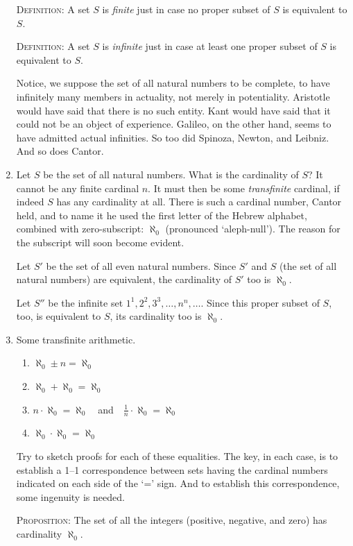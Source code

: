 \documentclass[twoside,openright]{article}
\begin{document}
\begin{enumerate}
  \textsc{Definition}: A set $S$ is \emph{finite} just in case no
  proper subset of $S$ is equivalent to $S$.

  \textsc{Definition}: A set $S$ is \emph{infinite} just in case at
  least one proper subset of $S$ is equivalent to $S$.

  Notice, we suppose the set of all natural numbers to be complete, to
  have infinitely many members in actuality, not merely in
  potentiality. Aristotle would have said that there is no such
  entity. Kant would have said that it could not be an object of
  experience. Galileo, on the other hand, seems to have admitted
  actual infinities. So too did Spinoza, Newton, and Leibniz. And so
  does Cantor.
\item \label{alephnull} Let $S$ be the set of all natural
  numbers. What is the cardinality of $S$? It cannot be any finite
  cardinal $n$. It must then be some \emph{transfinite} cardinal, if
  indeed $S$ has any cardinality at all. There is such a cardinal
  number, Cantor held, and to name it he used the first letter of the
  Hebrew alphabet, combined with zero-subscript: $\aleph_{0}$
  (pronounced `aleph-null'). The reason for the subscript will soon
  become evident. \label{subscript}

  Let $S'$ be the set of all even natural numbers. Since $S'$ and $S$
  (the set of all natural numbers) are equivalent, the cardinality of
  $S'$ too is $\aleph_{0}$.

  Let $S''$ be the infinite set $1^1, 2^2, 3^3, \dotsc, n^n,
  \dotsc$. Since this proper subset of $S$, too, is equivalent to $S$,
  its cardinality too is $\aleph_{0}$.
\item Some transfinite arithmetic.\label{transarith}
  \begin{enumerate}[(1)]
  \item $\aleph_{0}\pm n=\aleph_{0}$
  \item $\aleph_{0}+\aleph_{0}=\aleph_{0}$
  \item $n\cdot\aleph_{0}=\aleph_{0}$\ \ and\ \
    $\frac{1}{n}\cdot\aleph_{0}=\aleph_{0}$
  \item $\aleph_{0}\cdot\aleph_{0}=\aleph_{0}$
  \end{enumerate}
  Try to sketch proofs for each of these equalities. The key, in each
  case, is to establish a 1--1 correspondence between sets having the
  cardinal numbers indicated on each side of the `=' sign. And to
  establish this correspondence, some ingenuity is needed.

  \textsc{Proposition}: The set of all the integers (positive,
  negative, and zero) has cardinality $\aleph_{0}$.


\end{enumerate}
\end{document}
